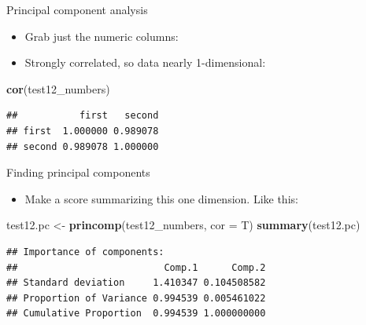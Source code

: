 \documentclass[
  ignorenonframetext,
]{beamer}
\newenvironment{Shaded}{\begin{snugshade}}{\end{snugshade}}
\newcommand{\DataTypeTok}[1]{\textcolor[rgb]{0.13,0.29,0.53}{#1}}
\newcommand{\KeywordTok}[1]{\textcolor[rgb]{0.13,0.29,0.53}{\textbf{#1}}}
\newcommand{\NormalTok}[1]{#1}
\newcommand{\OperatorTok}[1]{\textcolor[rgb]{0.81,0.36,0.00}{\textbf{#1}}}
\newcommand{\StringTok}[1]{\textcolor[rgb]{0.31,0.60,0.02}{#1}}
\providecommand{\tightlist}{%
  \setlength{\itemsep}{0pt}\setlength{\parskip}{0pt}}
\begin{document}
\begin{frame}[fragile]{Principal component analysis}
\protect\hypertarget{principal-component-analysis}{}

\begin{itemize}
\tightlist
\item
  Grab just the numeric columns:
\end{itemize}

\begin{Shaded}
\end{Shaded}

\begin{itemize}
\tightlist
\item
  Strongly correlated, so data nearly 1-dimensional:
\end{itemize}

\begin{Shaded}
\begin{Highlighting}[]
\KeywordTok{cor}\NormalTok{(test12_numbers)}
\end{Highlighting}
\end{Shaded}

\begin{verbatim}
##           first   second
## first  1.000000 0.989078
## second 0.989078 1.000000
\end{verbatim}

\end{frame}

\begin{frame}[fragile]{Finding principal components}
\protect\hypertarget{finding-principal-components}{}

\begin{itemize}
\tightlist
\item
  Make a score summarizing this one dimension. Like this:
\end{itemize}

\begin{Shaded}
\begin{Highlighting}[]
\NormalTok{test12.pc <-}\StringTok{ }\KeywordTok{princomp}\NormalTok{(test12_numbers, }\DataTypeTok{cor =}\NormalTok{ T)}
\KeywordTok{summary}\NormalTok{(test12.pc)}
\end{Highlighting}
\end{Shaded}

\begin{verbatim}
## Importance of components:
##                          Comp.1      Comp.2
## Standard deviation     1.410347 0.104508582
## Proportion of Variance 0.994539 0.005461022
## Cumulative Proportion  0.994539 1.000000000
\end{verbatim}

\end{frame}
\end{document}
